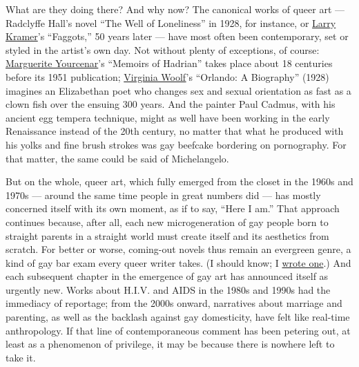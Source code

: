 What are they doing there? And why now? The canonical works of queer art
--- Radclyffe Hall's novel ``The Well of Loneliness'' in 1928, for
instance, or
\href{https://www.nytimes3xbfgragh.onion/2016/03/04/t-magazine/my-10-favorite-books-larry-kramer.html}{Larry
Kramer}'s ``Faggots,'' 50 years later --- have most often been
contemporary, set or styled in the artist's own day. Not without plenty
of exceptions, of course:
\href{https://www.nytimes3xbfgragh.onion/1987/12/19/obituaries/marguerite-yourcenar-writer-and-scholar-dies.html}{Marguerite
Yourcenar}'s ``Memoirs of Hadrian'' takes place about 18 centuries
before its 1951 publication;
\href{https://www.nytimes3xbfgragh.onion/topic/person/virginia-woolf}{Virginia
Woolf}'s ``Orlando: A Biography'' (1928) imagines an Elizabethan poet
who changes sex and sexual orientation as fast as a clown fish over the
ensuing 300 years. And the painter Paul Cadmus, with his ancient egg
tempera technique, might as well have been working in the early
Renaissance instead of the 20th century, no matter that what he produced
with his yolks and fine brush strokes was gay beefcake bordering on
pornography. For that matter, the same could be said of Michelangelo.

But on the whole, queer art, which fully emerged from the closet in the
1960s and 1970s --- around the same time people in great numbers did ---
has mostly concerned itself with its own moment, as if to say, ``Here I
am.'' That approach continues because, after all, each new
microgeneration of gay people born to straight parents in a straight
world must create itself and its aesthetics from scratch. For better or
worse, coming-out novels thus remain an evergreen genre, a kind of gay
bar exam every queer writer takes. (I should know; I
\href{https://www.barnesandnoble.com/w/o-beautiful-jesse-green/1000128265?ean=9780345374707}{wrote
one}.) And each subsequent chapter in the emergence of gay art has
announced itself as urgently new. Works about H.I.V. and AIDS in the
1980s and 1990s had the immediacy of reportage; from the 2000s onward,
narratives about marriage and parenting, as well as the backlash against
gay domesticity, have felt like real-time anthropology. If that line of
contemporaneous comment has been petering out, at least as a phenomenon
of privilege, it may be because there is nowhere left to take it.

